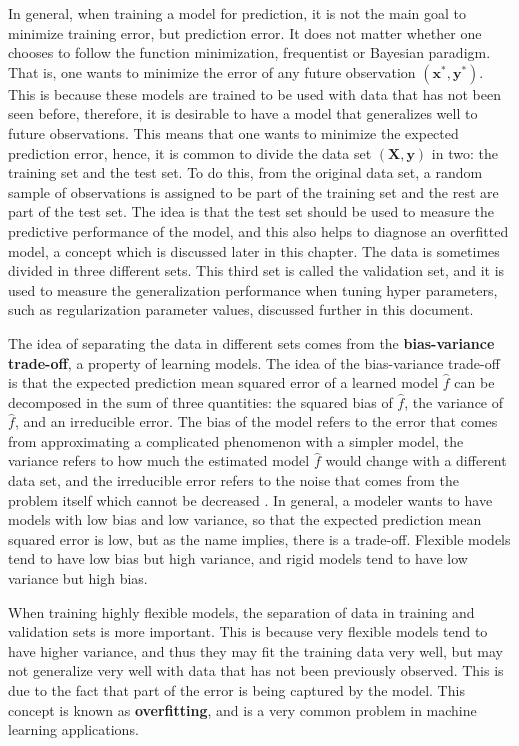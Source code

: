 In general, when training a model for prediction, it is not the main goal to minimize training error, but prediction error. It does not matter whether one chooses to follow the function minimization, frequentist or Bayesian paradigm. That is, one wants to minimize the error of any future observation $(\boldsymbol{x}^*, \boldsymbol{y}^*)$. This is because these models are trained to be used with data that has not been seen before, therefore, it is desirable to have a model that generalizes well to future observations. This means that one wants to minimize the expected prediction error, hence, it is common to divide the data set $(\boldsymbol{X}, \boldsymbol{y})$ in two: the training set and the test set. To do this, from the original data set, a random sample of observations is assigned to be part of the training set and the rest are part of the test set. The idea is that the test set should be used to measure the predictive performance of the model, and this also helps to diagnose an overfitted model, a concept which is discussed later in this chapter. The data is sometimes divided in three different sets. This third set is called the validation set, and it is used to measure the generalization performance when tuning hyper parameters, such as regularization parameter values, discussed further in this document.

The idea of separating the data in different sets comes from the \textbf{bias-variance trade-off}, a property of learning models. The idea of the bias-variance trade-off is that the expected prediction mean squared error of a learned model $\hat{f}$ can be decomposed in the sum of three quantities: the squared bias of $\hat{f}$, the variance of $\hat{f}$, and an irreducible error. The bias of the model refers to the error that comes from approximating a complicated phenomenon with a simpler model, the variance refers to how much the estimated model $\hat{f}$ would change with a different data set, and the irreducible error refers to the noise that comes from the problem itself which cannot be decreased \cite{friedman2001elements} \cite{james2013introduction}. In general, a modeler wants to have models with low bias and low variance, so that the expected prediction mean squared error is low, but as the name implies, there is a trade-off. Flexible models tend to have low bias but high variance, and rigid models tend to have low variance but high bias.

When training highly flexible models, the separation of data in training and validation sets is more important. This is because very flexible models tend to have higher variance, and thus they may fit the training data very well, but may not generalize very well with data that has not been previously observed. This is due to the fact that part of the error is being captured by the model. This concept is known as \textbf{overfitting}, and is a very common problem in machine learning applications.



